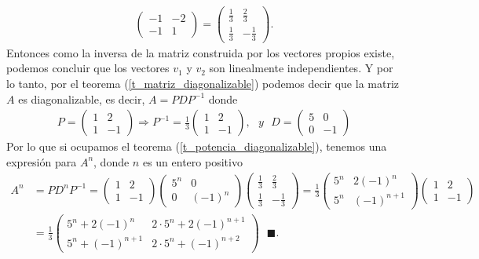 \documentclass[11pt,letterpaper]{article}
\newcommand{\finf}{\blacksquare.}
\begin{document}
\begin{enumerate}
\begin{align*}
\begin{pmatrix}
-1&-2\\
-1&1
\end{pmatrix}= \begin{pmatrix}
\frac{1}{3} & \frac{2}{3}\\
\frac{1}{3} & -\frac{1}{3}
\end{pmatrix}.
\end{align*}
Entonces como la inversa de la matriz construida por los vectores propios existe, podemos concluir que los vectores $v_1$ y $v_2$ son linealmente independientes. Y por lo tanto, por el teorema (\ref{t_matriz_diagonalizable}) podemos decir que la matriz $A$ es diagonalizable, es decir, $A=PDP^{-1}$ donde 
\begin{align*}
P=\begin{pmatrix}
1 & 2\\
1 & -1
\end{pmatrix}\Rightarrow P^{-1} =\frac{1}{3}\begin{pmatrix}
1 &  2\\
1 & -1
\end{pmatrix}, \ \ \ y \ \ \ D=\begin{pmatrix}
5 &0 \\
0 & -1
\end{pmatrix}
\end{align*}
Por lo que si ocupamos el teorema (\ref{t_potencia_diagonalizable}), tenemos una expresión para $A^n$, donde $n$ es un entero positivo 
\begin{align*}
A^n&=PD^nP^{-1}= \begin{pmatrix}
1 & 2\\
1 & -1
\end{pmatrix}\begin{pmatrix}
5^n &0 \\
0 & (-1)^n
\end{pmatrix}\begin{pmatrix}
\frac{1}{3} & \frac{2}{3}\\
\frac{1}{3} & -\frac{1}{3}
\end{pmatrix}=\frac{1}{3}\begin{pmatrix}
5^n & 2(-1)^n\\
5^n & (-1)^{n+1}
\end{pmatrix}\begin{pmatrix}
1 &2\\
1 & -1
\end{pmatrix}\\
&=\frac{1}{3}\begin{pmatrix}
5^n+2(-1)^n& 2\cdot 5^n+2(-1)^{n+1}\\
5^n+(-1)^{n+1}& 2\cdot 5^n+(-1)^{n+2}
\end{pmatrix} \ \ \ \finf
\end{align*}


\end{enumerate}
\end{document}
